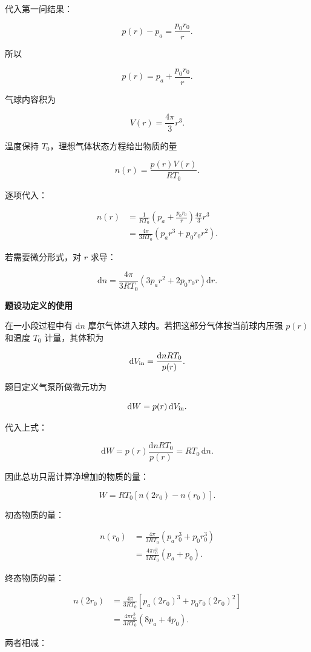 \documentclass[12pt,a4paper,UTF8]{ctexart}
\begin{document}
代入第一问结果：

\[p(r)-p_a=\frac{p_0r_0}{r}.\]

所以

\[\boxed{p(r)=p_a+\frac{p_0r_0}{r}}.\]

气球内容积为

\[V(r)=\frac{4\pi}{3}r^3.\]

温度保持 \(T_0\)，理想气体状态方程给出物质的量

\[n(r)=\frac{p(r)V(r)}{RT_0}.\]

逐项代入：

\[\begin{aligned}
n(r)
&=\frac{1}{RT_0}\left(p_a+\frac{p_0r_0}{r}\right)\frac{4\pi}{3}r^3\\
&=\frac{4\pi}{3RT_0}\left(p_ar^3+p_0r_0r^2\right).
\end{aligned}\]

若需要微分形式，对 \(r\) 求导：

\[\mathrm{d}n=\frac{4\pi}{3RT_0}\left(3p_ar^2+2p_0r_0r\right)\mathrm{d}r.\]

\textbf{题设功定义的使用}

在一小段过程中有 \(\mathrm{d}n\)
摩尔气体进入球内。若把这部分气体按当前球内压强 \(p(r)\) 和温度 \(T_0\)
计量，其体积为

\[\mathrm{d}V_{\rm in}=\frac{\mathrm{d}nRT_0}{p(r)}.\]

题目定义气泵所做微元功为

\[\mathrm{d}W=p(r)\,\mathrm{d}V_{\rm in}.\]

代入上式：

\[\mathrm{d}W=p(r)\frac{\mathrm{d}nRT_0}{p(r)}=RT_0\,\mathrm{d}n.\]

因此总功只需计算净增加的物质的量：

\[W=RT_0[n(2r_0)-n(r_0)].\]

初态物质的量：

\[\begin{aligned}
n(r_0)
&=\frac{4\pi}{3RT_0}\left(p_ar_0^3+p_0r_0^3\right)\\
&=\frac{4\pi r_0^3}{3RT_0}(p_a+p_0).
\end{aligned}\]

终态物质的量：

\[\begin{aligned}
n(2r_0)
&=\frac{4\pi}{3RT_0}\left[p_a(2r_0)^3+p_0r_0(2r_0)^2\right]\\
&=\frac{4\pi r_0^3}{3RT_0}(8p_a+4p_0).
\end{aligned}\]

两者相减：
\end{document}
